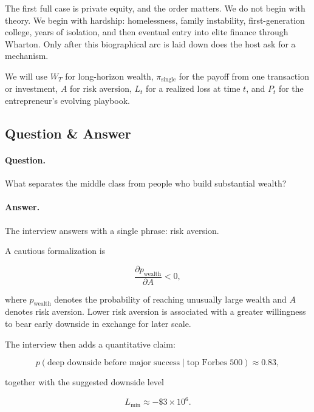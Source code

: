 The first full case is private equity, and the order matters. We do not begin with theory. We begin with hardship: homelessness, family instability, first-generation college, years of isolation, and then eventual entry into elite finance through Wharton. Only after this biographical arc is laid down does the host ask for a mechanism.

\begin{definition}
We will use \(W_T\) for long-horizon wealth, \(\pi_{\mathrm{single}}\) for the payoff from one transaction or investment, \(A\) for risk aversion, \(L_t\) for a realized loss at time \(t\), and \(P_t\) for the entrepreneur's evolving playbook.
\end{definition}

\subsection{Question \& Answer}

\paragraph{Question.} What separates the middle class from people who build substantial wealth?

\paragraph{Answer.} The interview answers with a single phrase: risk aversion.

A cautious formalization is

\begin{equation}
\frac{\partial p_{\mathrm{wealth}}}{\partial A} < 0,
\end{equation}

where \(p_{\mathrm{wealth}}\) denotes the probability of reaching unusually large wealth and \(A\) denotes risk aversion. Lower risk aversion is associated with a greater willingness to bear early downside in exchange for later scale.

The interview then adds a quantitative claim:

\begin{equation}
p(\mbox{deep downside before major success}\mid \mbox{top Forbes 500}) \approx 0.83,
\end{equation}

together with the suggested downside level

\begin{equation}
L_{\min} \approx -\$3\times 10^{6}.
\end{equation}

